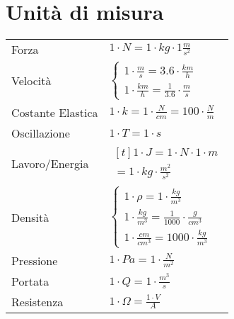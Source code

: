 \section{Unità di misura}
\begin{center}
  \begin{tabularx}{\textwidth}{ l l }
      Forza & $1 \cdot N = 1 \cdot kg \cdot 1 \frac{m}{s^2}$ \\
      Velocità & $\begin{cases}
        1 \cdot \frac{m}{s} = 3.6 \cdot \frac{km}{h} \\
        1 \cdot \frac{km}{h} = \frac{1}{3.6} \cdot \frac{m}{s}
      \end{cases}$ \\
      Costante Elastica & $1 \cdot k = 1 \cdot \frac{N}{cm} = 100 \cdot \frac{N}{m}$ \\
      Oscillazione & $1 \cdot T = 1 \cdot s$ \\
      Lavoro/Energia & $\!\begin{aligned}[t]1 \cdot J = 1 \cdot N \cdot 1 \cdot m \\ = 1 \cdot kg \cdot \frac{m^2}{s^2} \end{aligned}$ \\
      Densità & $\begin{cases}
        1 \cdot \rho = 1 \cdot \frac{kg}{m^3} \\
        1 \cdot \frac{kg}{m^3} = \frac{1}{1000} \cdot \frac{g}{cm^3} \\
        1 \cdot \frac{cm}{cm^3} = 1000 \cdot \frac{kg}{m^3}
      \end{cases}$ \\
      Pressione & $1 \cdot Pa = 1 \cdot \frac{N}{m^2}$ \\
      Portata & $1 \cdot Q = 1 \cdot \frac{m^3}{s}$ \\
      Resistenza & $1 \cdot \Omega = \frac{1 \cdot V}{A}$
  \end{tabularx}
\end{center}